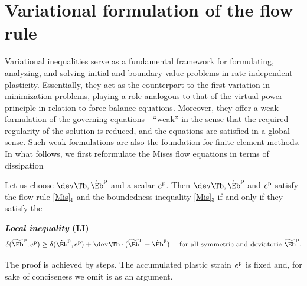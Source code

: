\section{Variational formulation of the flow rule}
Variational inequalities serve as a fundamental framework for formulating, analyzing, and solving initial and boundary value problems in rate-independent plasticity. Essentially, they act as the counterpart to the first variation in minimization problems, playing a role analogous to that of the virtual power principle in relation to force balance equations. Moreover, they offer a weak formulation of the governing equations—``weak'' in the sense that the required regularity of the solution is reduced, and the equations are satisfied in a global sense. Such weak formulations are also the foundation for finite element methods. In what follows, we first reformulate the Mises flow equations in terms of dissipation

\medskip

Let us choose $\dev\Tb, \dot{\Eb}^{\rm p}$ and a scalar $e^{\rm p}$. Then $\dev\Tb, \dot{\Eb}^{\rm p}$ and  $e^{\rm p}$ satisfy the flow rule \eqref{Mis}$_1$ and the boundedness inequality 
 \eqref{Mis}$_3$ if and only if they satisfy the 
\begin{definition}
\textbf{\textit{Local inequality} (LI)}
	 \begin{equation}\label{LI}
 	\delta(\widetilde{\Eb}^{\rm p}, e^{\rm p})\geq \delta(\dot{\Eb}^{\rm p}, e^{\rm p})+\dev\Tb\cdot(\widetilde{\Eb}^{\rm p}-\dot{\Eb}^{\rm p}) \quad \textrm{ for all symmetric and deviatoric $\widetilde{\Eb}^{\rm p}$.}
 \end{equation}
\end{definition}
The proof is achieved by steps. The accumulated plastic strain $e^{\rm p}$ is fixed and, for sake of conciseness we omit is as an argument.

